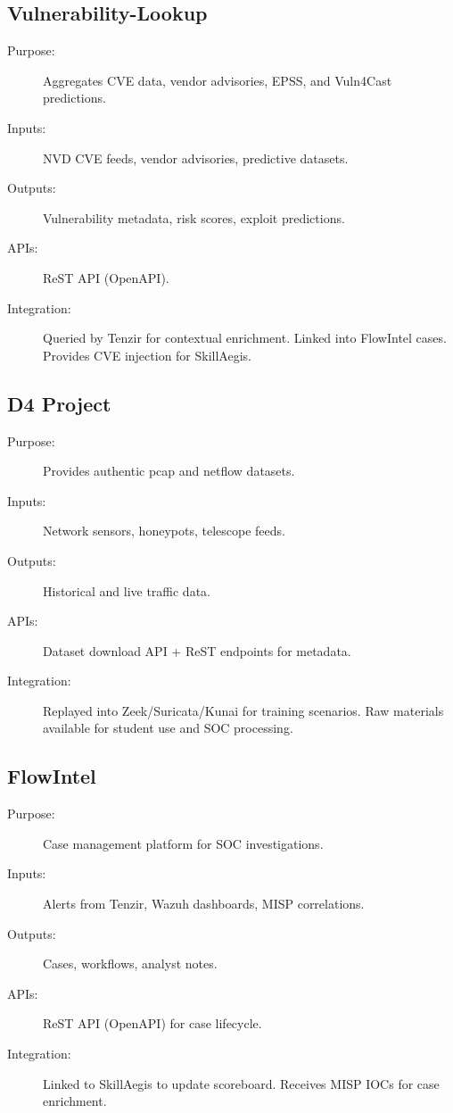\documentclass[10pt,a4paper]{report}
\begin{document}
\subsection{Vulnerability-Lookup}
\begin{description}
  \item[Purpose:] Aggregates CVE data, vendor advisories, EPSS, and Vuln4Cast
  predictions.
  \item[Inputs:] NVD CVE feeds, vendor advisories, predictive datasets.
  \item[Outputs:] Vulnerability metadata, risk scores, exploit predictions.
  \item[APIs:] ReST API (OpenAPI).
  \item[Integration:] Queried by Tenzir for contextual enrichment. Linked into
  FlowIntel cases. Provides CVE injection for SkillAegis.
\end{description}

\subsection{D4 Project}
\begin{description}
  \item[Purpose:] Provides authentic pcap and netflow datasets.
  \item[Inputs:] Network sensors, honeypots, telescope feeds.
  \item[Outputs:] Historical and live traffic data.
  \item[APIs:] Dataset download API + ReST endpoints for metadata.
  \item[Integration:] Replayed into Zeek/Suricata/Kunai for training
  scenarios. Raw materials available for student use and SOC processing.
\end{description}

\subsection{FlowIntel}
\begin{description}
  \item[Purpose:] Case management platform for SOC investigations.
  \item[Inputs:] Alerts from Tenzir, Wazuh dashboards, MISP correlations.
  \item[Outputs:] Cases, workflows, analyst notes.
  \item[APIs:] ReST API (OpenAPI) for case lifecycle.
  \item[Integration:] Linked to SkillAegis to update scoreboard. Receives
  MISP IOCs for case enrichment.
\end{description}
\end{document}

